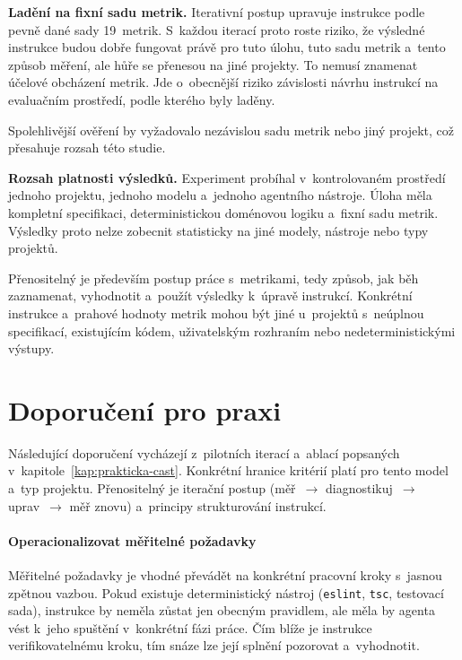 \textbf{Ladění na fixní sadu metrik.}
Iterativní postup upravuje instrukce podle pevně dané sady
19~metrik. S~každou iterací proto roste riziko, že výsledné instrukce
budou dobře fungovat právě pro tuto úlohu, tuto sadu metrik a~tento
způsob měření, ale hůře se přenesou na jiné projekty. To nemusí
znamenat účelové obcházení metrik. Jde o~obecnější riziko závislosti
návrhu instrukcí na evaluačním prostředí, podle kterého byly laděny.

Spolehlivější ověření by vyžadovalo nezávislou sadu metrik nebo jiný
projekt, což přesahuje rozsah této studie.



\textbf{Rozsah platnosti výsledků.}
Experiment probíhal v~kontrolovaném prostředí jednoho projektu,
jednoho modelu a~jednoho agentního nástroje. Úloha měla kompletní
specifikaci, deterministickou doménovou logiku a~fixní sadu metrik.
Výsledky proto nelze zobecnit statisticky na jiné modely, nástroje
nebo typy projektů.

Přenositelný je především postup práce s~metrikami, tedy způsob, jak
běh zaznamenat, vyhodnotit a~použít výsledky k~úpravě instrukcí.
Konkrétní instrukce a~prahové hodnoty metrik mohou být jiné
u~projektů s~neúplnou specifikací, existujícím kódem, uživatelským
rozhraním nebo nedeterministickými výstupy.

\section{Doporučení pro praxi}
\label{sec:doporuceni}

Následující doporučení vycházejí z~pilotních iterací a~ablací
popsaných v~kapitole~\ref{kap:prakticka-cast}. Konkrétní hranice
kritérií platí pro tento model a~typ projektu. Přenositelný je iterační
postup (měř~$\to$ diagnostikuj~$\to$ uprav~$\to$ měř znovu)
a~principy strukturování instrukcí.

\paragraph{Operacionalizovat měřitelné požadavky}
Měřitelné požadavky je vhodné převádět na konkrétní pracovní kroky
s~jasnou zpětnou vazbou. Pokud existuje deterministický nástroj
(\texttt{eslint}, \texttt{tsc}, testovací sada), instrukce by neměla
zůstat jen obecným pravidlem, ale měla by agenta vést k~jeho spuštění
v~konkrétní fázi práce. Čím blíže je instrukce verifikovatelnému
kroku, tím snáze lze její splnění pozorovat a~vyhodnotit.


